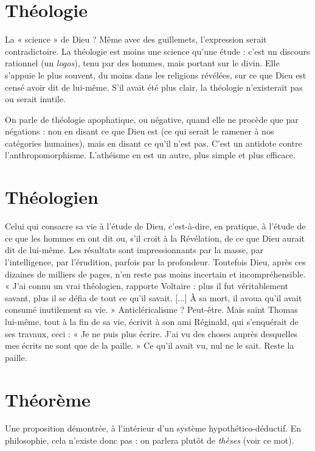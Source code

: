 \section{Théologie}
La « science » de Dieu ? Même avec des guillemets, l’expression
serait contradictoire. La théologie est moins une science
qu'une étude : c’est un discours rationnel (un {\it logos}), tenu par des hommes,
mais portant sur le divin. Elle s’appuie le plus souvent, du moins dans les religions
révélées, sur ce que Dieu est censé avoir dit de lui-même. S'il avait été
plus clair, la théologie n’existerait pas ou serait inutile.

On parle de théologie apophatique, ou négative, quand elle ne procède
que par négations : non en disant ce que Dieu est (ce qui serait le ramener à
nos catégories humaines), mais en disant ce qu’il n’est pas. C’est un antidote
contre l’anthropomorphisme. L’athéisme en est un autre, plus simple et plus
efficace.

\section{Théologien}
Celui qui consacre sa vie à l’étude de Dieu, c’est-à-dire, en
pratique, à l'étude de ce que les hommes en ont dit ou, s’il
croit à la Révélation, de ce que Dieu aurait dit de lui-même. Les résultats sont
impressionnants par la masse, par l'intelligence, par l’érudition, parfois par la
profondeur. Toutefois Dieu, après ces dizaines de milliers de pages, n’en reste
pas moins incertain et incompréhensible. « J’ai connu un vrai théologien, rapporte
Voltaire : plus il fut véritablement savant, plus il se défia de tout ce qu'il
savait. [...] À sa mort, il avoua qu’il avait consumé inutilement sa vie. »
Anticléricalisme ? Peut-être. Mais saint Thomas lui-même, tout à la fin de sa
vie, écrivit à son ami Réginald, qui s’enquérait de ses travaux, ceci : « Je ne puis
plus écrire. J'ai vu des choses auprès desquelles mes écrits ne sont que de la
paille. » Ce qu’il avait vu, nul ne le sait. Reste la paille.

\section{Théorème}
Une proposition démontrée, à l’intérieur d’un système hypothético-déductif.
En philosophie, cela n’existe donc pas : on
parlera plutôt de {\it thèses} (voir ce mot).

